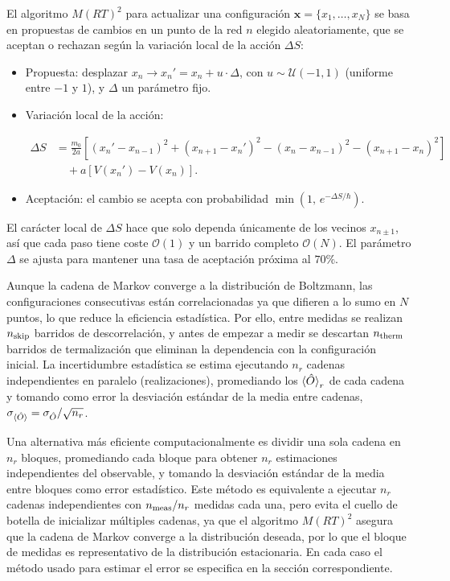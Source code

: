 \documentclass[11pt,a4paper,twoside,pdf]{article}
\numberwithin{equation}{section}
\begin{document}
El algoritmo $M(RT)^2$ para actualizar una configuración $\mathbf{x} = \{x_1, \ldots, x_N\}$ se basa en propuestas de cambios en un punto de la red $n$ elegido aleatoriamente, que se aceptan o rechazan según la variación local de la acción $\Delta S$:

\begin{itemize}
    \item Propuesta: desplazar $x_n \to x_n' = x_n + u\cdot \Delta$, con $u \sim \mathcal{U}(-1, 1)$ (uniforme entre $-1$ y $1$), y $\Delta$ un parámetro fijo.

    \item Variación local de la acción:

    \begin{equation}
    \begin{split}
        \Delta S &= \frac{m_0}{2a} \left[ (x_n' - x_{n-1})^2 + (x_{n+1} - x_n')^2 - (x_n - x_{n-1})^2 - (x_{n+1} - x_n)^2 \right] \\
                 &\quad + a \left[ V(x_n') - V(x_n) \right].
    \end{split}
    \label{deltaS}
    \end{equation}

    \item Aceptación: el cambio se acepta con probabilidad $\min(1,\, e^{-\Delta S/\hbar})$.
\end{itemize}


El carácter local de $\Delta S$ hace que solo dependa únicamente de los vecinos $x_{n\pm 1}$, así que cada paso tiene coste $\mathcal{O}(1)$ y un barrido completo $\mathcal{O}(N)$. El parámetro $\Delta$ se ajusta para mantener una tasa de aceptación próxima al $70\%$. \medskip


Aunque la cadena de Markov converge a la distribución de Boltzmann, las configuraciones consecutivas están correlacionadas ya que difieren a lo sumo en $N$ puntos, lo que reduce la eficiencia estadística. Por ello, entre medidas se realizan $n_{\rm skip}$ barridos de descorrelación, y antes de empezar a medir se descartan $n_{\rm therm}$ barridos de termalización que eliminan la dependencia con la configuración inicial. La incertidumbre estadística se estima ejecutando $n_r$ cadenas independientes en paralelo (realizaciones), promediando los $\braket{\hat{O}}_{r}$ de cada cadena y tomando como error la desviación estándar de la media entre cadenas, $\sigma_{\braket{\hat{O}}} = \sigma_{\hat{O}}/\sqrt{n_r}$. 

Una alternativa más eficiente computacionalmente es dividir una sola cadena en $n_r$ bloques, promediando cada bloque para obtener $n_r$ estimaciones independientes del observable, y tomando la desviación estándar de la media entre bloques como error estadístico. Este método es equivalente a ejecutar $n_r$ cadenas independientes con $n_{\rm meas}/n_r$ medidas cada una, pero evita el cuello de botella de inicializar múltiples cadenas, ya que el algoritmo $M(RT)^2$ asegura que la cadena de Markov converge a la distribución deseada, por lo que el bloque de medidas es representativo de la distribución estacionaria. En cada caso el método usado para estimar el error se especifica en la sección correspondiente.
\end{document}

